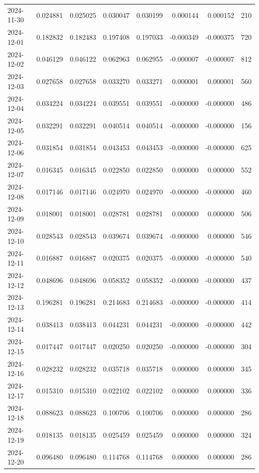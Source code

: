 \begin{tabular}{lrrrrrrr}
2024-11-30 & 0.024881 & 0.025025 & 0.030047 & 0.030199 & 0.000144 & 0.000152 & 210 \\
2024-12-01 & 0.182832 & 0.182483 & 0.197408 & 0.197033 & -0.000349 & -0.000375 & 720 \\
2024-12-02 & 0.046129 & 0.046122 & 0.062963 & 0.062955 & -0.000007 & -0.000007 & 812 \\
2024-12-03 & 0.027658 & 0.027658 & 0.033270 & 0.033271 & 0.000001 & 0.000001 & 560 \\
2024-12-04 & 0.034224 & 0.034224 & 0.039551 & 0.039551 & -0.000000 & -0.000000 & 486 \\
2024-12-05 & 0.032291 & 0.032291 & 0.040514 & 0.040514 & -0.000000 & -0.000000 & 156 \\
2024-12-06 & 0.031854 & 0.031854 & 0.043453 & 0.043453 & -0.000000 & -0.000000 & 625 \\
2024-12-07 & 0.016345 & 0.016345 & 0.022850 & 0.022850 & 0.000000 & 0.000000 & 552 \\
2024-12-08 & 0.017146 & 0.017146 & 0.024970 & 0.024970 & -0.000000 & -0.000000 & 460 \\
2024-12-09 & 0.018001 & 0.018001 & 0.028781 & 0.028781 & 0.000000 & 0.000000 & 506 \\
2024-12-10 & 0.028543 & 0.028543 & 0.039674 & 0.039674 & -0.000000 & 0.000000 & 546 \\
2024-12-11 & 0.016887 & 0.016887 & 0.020375 & 0.020375 & -0.000000 & -0.000000 & 540 \\
2024-12-12 & 0.048696 & 0.048696 & 0.058352 & 0.058352 & -0.000000 & -0.000000 & 437 \\
2024-12-13 & 0.196281 & 0.196281 & 0.214683 & 0.214683 & -0.000000 & -0.000000 & 414 \\
2024-12-14 & 0.038413 & 0.038413 & 0.044231 & 0.044231 & -0.000000 & -0.000000 & 442 \\
2024-12-15 & 0.017447 & 0.017447 & 0.020250 & 0.020250 & -0.000000 & -0.000000 & 304 \\
2024-12-16 & 0.028232 & 0.028232 & 0.035718 & 0.035718 & 0.000000 & 0.000000 & 345 \\
2024-12-17 & 0.015310 & 0.015310 & 0.022102 & 0.022102 & 0.000000 & 0.000000 & 336 \\
2024-12-18 & 0.088623 & 0.088623 & 0.100706 & 0.100706 & 0.000000 & 0.000000 & 286 \\
2024-12-19 & 0.018135 & 0.018135 & 0.025459 & 0.025459 & 0.000000 & 0.000000 & 324 \\
2024-12-20 & 0.096480 & 0.096480 & 0.114768 & 0.114768 & 0.000000 & 0.000000 & 286 \\

\end{tabular}
